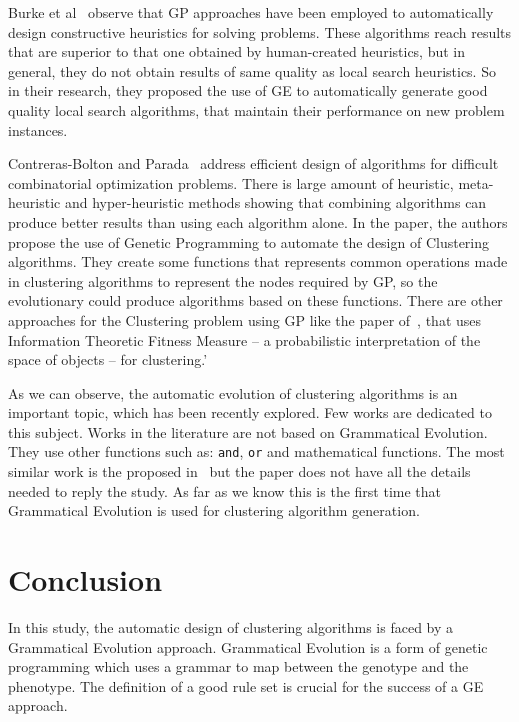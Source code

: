 \documentclass[conference]{IEEEtran}
\begin{document}
	Burke et al~\cite{burke2012grammatical} observe that GP approaches have been employed to automatically design constructive heuristics for solving problems. These algorithms reach results that are superior to that one obtained by human-created heuristics, but in general, they do not obtain results of same quality as local search heuristics. So in their research, they proposed the use of GE to automatically generate good quality local search algorithms, that maintain their performance on new problem instances.
	
	Contreras-Bolton and Parada~\cite{bolton2015optimizing} address efficient design of algorithms for difficult combinatorial optimization problems. There is large amount of heuristic, meta-heuristic and hyper-heuristic methods showing that combining algorithms can produce better results than using each algorithm alone. In the paper, the authors propose the use of Genetic Programming to automate the design of Clustering algorithms. They create some functions that represents common operations made in clustering algorithms to represent the nodes required by GP, so the evolutionary could produce algorithms based on these functions. There are other approaches for the Clustering problem using GP like the paper of~\cite{boric2007genetic}, that uses Information Theoretic Fitness Measure -- a probabilistic interpretation of the space of objects -- for clustering.'
	
	As we can observe, the automatic evolution of clustering algorithms is an important topic, which has been recently explored. Few works are dedicated to this subject. Works in the literature are not based on Grammatical Evolution. They use other functions such as: \texttt{and}, \texttt{or} and mathematical functions. The most similar work is the proposed in~\cite{bolton2015optimizing} but the paper does not have all the details needed to reply the study.  As far as we know this is the first time that Grammatical Evolution is used for clustering algorithm generation. 
	
	
	\section{Conclusion}
	\label{sec:conclusion}
	
	
	In this study, the automatic design of clustering algorithms is faced by a Grammatical Evolution approach. Grammatical Evolution is a form of genetic programming which uses a grammar to map between the genotype and the phenotype. The definition of a good rule set is crucial for the success of a GE approach. 
	
\end{document}
